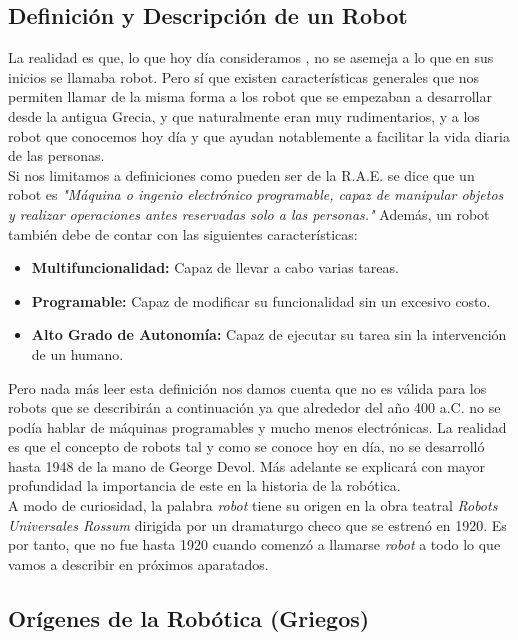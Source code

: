 
\subsection{Definición y Descripción de un Robot}


La realidad es que, lo que hoy día consideramos , no se asemeja a lo que en sus inicios se llamaba robot. Pero sí que existen características generales que nos permiten llamar de la misma forma a los robot que se empezaban a desarrollar desde la antigua Grecia, y que naturalmente eran muy rudimentarios, y a los robot que conocemos hoy día y que ayudan notablemente a facilitar la vida diaria de las personas.\\

Si nos limitamos a definiciones como pueden ser de la R.A.E. se dice que un robot es \textit{"Máquina o ingenio electrónico programable, capaz de manipular objetos y realizar operaciones antes reservadas solo a las personas."} Además, un robot también debe de contar con las siguientes características:

\begin{itemize}
\item \textbf{Multifuncionalidad:} Capaz de llevar a cabo varias tareas.
\item \textbf{Programable:} Capaz de modificar su funcionalidad sin un excesivo costo.
\item \textbf{Alto Grado de Autonomía:} Capaz de ejecutar su tarea sin la intervención de un humano.
\end{itemize}

Pero nada más leer esta definición nos damos cuenta que no es válida para los robots que se describirán a continuación ya que alrededor del año 400 a.C. no se podía hablar de máquinas programables y mucho menos electrónicas. La realidad es que el concepto de robots tal y como se conoce hoy en día, no se desarrolló hasta 1948 de la mano de George Devol. Más adelante se explicará con mayor profundidad la importancia de este en la historia de la robótica.\\

A modo de curiosidad, la palabra \textit{robot} tiene su origen en la obra teatral \textit{Robots Universales Rossum} dirigida por un dramaturgo checo que se estrenó en 1920. Es por tanto, que no fue hasta 1920 cuando comenzó a llamarse \textit{robot} a todo lo que vamos a describir en próximos aparatados.

\subsection{Orígenes de la Robótica (Griegos)}

